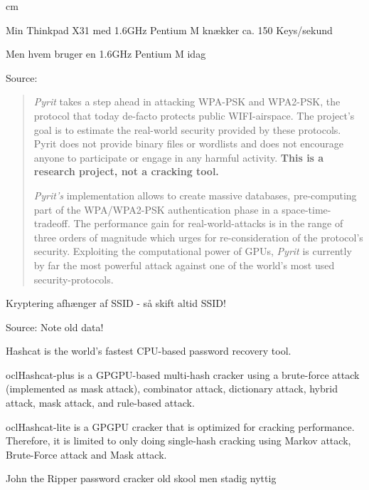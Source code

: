 \documentclass[20pt,landscape,a4paper,footrule]{foils}
\begin{document}
 cm

\centerline{Min Thinkpad X31 med 1.6GHz Pentium M knækker ca. 150 Keys/sekund}

\centerline{Men hvem bruger en 1.6GHz Pentium M idag \smiley}



Source: 


\begin{quote}
\emph{Pyrit} takes a step ahead in attacking WPA-PSK and WPA2-PSK, the protocol that today de-facto protects public WIFI-airspace. The project's goal is to estimate the real-world security provided by these protocols. Pyrit does not provide binary files or wordlists and does not encourage anyone to participate or engage in any harmful activity. {\bf This is a research project, not a cracking tool.}

\emph{Pyrit's} implementation allows to create massive databases, pre-computing part of the WPA/WPA2-PSK authentication phase in a space-time-tradeoff. The performance gain for real-world-attacks is in the range of three orders of magnitude which urges for re-consideration of the protocol's security. Exploiting the computational power of GPUs, \emph{Pyrit} is currently by far the most powerful attack against one of the world's most used security-protocols.
\end{quote}

\begin{list1}
\item Kryptering afhænger af SSID - så skift altid SSID!
\item {}
\end{list1}



Source:  Note old data!


\begin{list2}
\item Hashcat is the world's fastest CPU-based password recovery tool.
\item oclHashcat-plus is a GPGPU-based multi-hash cracker using a brute-force attack (implemented as mask attack), combinator attack, dictionary attack, hybrid attack, mask attack, and rule-based attack.
\item oclHashcat-lite is a GPGPU cracker that is optimized for cracking performance. Therefore, it is limited to only doing single-hash cracking using Markov attack, Brute-Force attack and Mask attack.
\item John the Ripper password cracker old skool men stadig nyttig
\end{list2}
\end{document}
